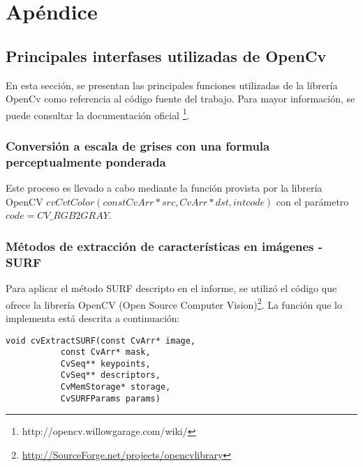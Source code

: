 \chapter{Apéndice}
\label{a:ApendiceA}
\section{Principales interfases utilizadas de OpenCv}
En esta sección, se presentan las principales funciones utilizadas de la librería OpenCv como referencia al código fuente del trabajo. Para mayor información, se puede consultar la documentación oficial \footnote{http://opencv.willowgarage.com/wiki/}.

\subsection{Conversión a escala de grises con una formula perceptualmente ponderada}
Este proceso es llevado a cabo mediante la función provista por la librería OpenCV $cvCvtColor(const CvArr* src, CvArr* dst, int code)$ con el parámetro $code=CV\_RGB2GRAY$.

\subsection[Extracción de características en imágenes - SURF]{Métodos de extracción de características en imágenes - SURF}
\label{extraccion_caracteristicas}
Para aplicar el método SURF descripto en el informe, se utilizó el código que ofrece la librería OpenCV (Open Source Computer Vision)\footnote{\url{http://SourceForge.net/projects/opencvlibrary}}. La funci\'on que lo implementa est\'a descrita a continuaci\'on:

\begin{lstlisting}
void cvExtractSURF(const CvArr* image, 
		   const CvArr* mask, 
		   CvSeq** keypoints, 
		   CvSeq** descriptors, 
		   CvMemStorage* storage, 
		   CvSURFParams params)
\end{lstlisting}

